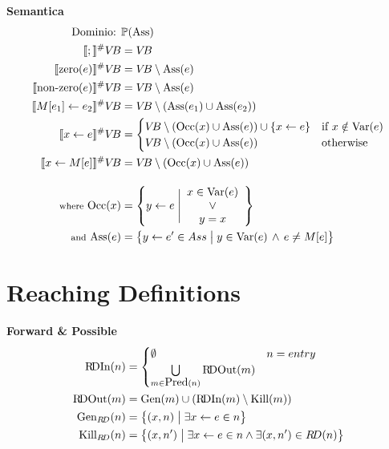 \documentclass[a4paper,12pt,openany]{article}
\newcommand{\VB}{V\!B}
\newcommand{\RD}{R\!D}
\begin{document}
    \textbf{Semantica}
    \begin{align*}
    \mbox{Dominio: }& \mathbb{P}(\mbox{Ass})\\
    \llbracket ; \rrbracket^\#\VB &= \VB\\
    \llbracket \mbox{zero}(e) \rrbracket^\#\VB &= \VB \setminus \mbox{Ass}(e)\\
    \llbracket \mbox{non-zero}(e) \rrbracket^\#\VB &= \VB \setminus \mbox{Ass}(e)\\
    \llbracket M[e_1]\leftarrow e_2 \rrbracket^\#\VB &= \VB \setminus (\mbox{Ass}(e_1) \cup \mbox{Ass}(e_2))\\
    \llbracket x \leftarrow e \rrbracket^\#\VB &= 
    \begin{cases}
    \VB \setminus (\mbox{Occ}(x) \cup \mbox{Ass}(e)) \cup \{x\leftarrow e\}& \mbox{if } x \notin \mbox{Var}(e)\\
    \VB \setminus (\mbox{Occ}(x) \cup \mbox{Ass}(e)) & \mbox{otherwise}
    \end{cases}\\
    \llbracket x\leftarrow M[e] \rrbracket^\#\VB &= \VB \setminus (\mbox{Occ}(x) \cup \mbox{Ass}(e))\\[1em]
    \mbox{{\footnotesize where} Occ}(x) &=
    \left\{
        y\leftarrow e \;\Bigg\vert
        \begin{array}{cc}
            x \in \mbox{Var}(e)\\
            \lor\\
            y=x
        \end{array}
    \right\}\\
    \mbox{{\footnotesize and} Ass}(e) &=
    \left\{
    y\leftarrow e' \in Ass \;\big\vert\;
    y \in \mbox{Var}(e) \,\land\, e \neq M[e]
    \right\}\\
    \end{align*}


    \section*{Reaching Definitions}
    \textbf{Forward \& Possible}
    \begin{align*}
        \mbox{\RD In}(n) &=
        \begin{cases}
            \emptyset & n = entry\\
            \bigcup\limits_{m\in \mbox{Pred}(n)} \mbox{\RD Out}(m)
        \end{cases}\\
        \mbox{\RD Out}(m) &= \mbox{Gen}(m) \cup (\mbox{\RD In}(m) \setminus \mbox{Kill}(m))\\
        \mbox{Gen}_{\RD}(n) &= \left\{
            (x,n) \;\big\vert\; \exists x\leftarrow e \in n
        \right\}\\
        \mbox{Kill}_{\RD}(n) &= \left\{
            (x,n') \;\big\vert\; \exists x\leftarrow e \in n \land \exists (x,n')\in\RD(n)
        \right\}
    \end{align*}
    
\end{document}
